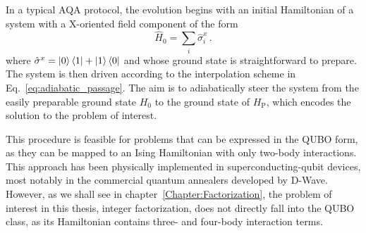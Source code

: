 In a typical AQA protocol, the evolution begins with an initial Hamiltonian of a system with a X-oriented field component of the form
\begin{equation}
    \hat{H}_0 = \sum_i \hat{\sigma}_i^x\,.
    \label{eq:transverse_field_hamiltonian}
\end{equation}
where $\hat{\sigma}^x = \ket{0}\bra{1}+\ket{1}\bra{0}$ and whose ground state is straightforward to prepare. The system is then driven according to the interpolation scheme in Eq.~\eqref{eq:adiabatic_passage}. The aim is to adiabatically steer the system from the easily preparable ground state $H_0$ to the ground state of $H_\mathrm{P}$, which encodes the solution to the problem of interest.

This procedure is feasible for problems that can be expressed in the QUBO form, as they can be mapped to an Ising Hamiltonian with only two-body interactions. This approach has been physically implemented in superconducting-qubit devices, most notably in the commercial quantum annealers developed by D-Wave. However, as we shall see in chapter~\ref{Chapter:Factorization}, the problem of interest in this thesis, integer factorization, does not directly fall into the QUBO class, as its Hamiltonian contains three- and four-body interaction terms.